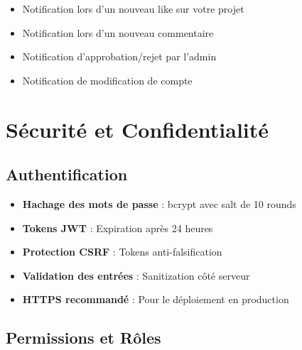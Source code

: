 \documentclass[12pt,a4paper]{article}
\begin{document}
\begin{itemize}[leftmargin=*]
    \item Notification lors d'un nouveau like sur votre projet
    \item Notification lors d'un nouveau commentaire
    \item Notification d'approbation/rejet par l'admin
    \item Notification de modification de compte
\end{itemize}

\newpage
\section{Sécurité et Confidentialité}

\subsection{Authentification}

\begin{tcolorbox}[colback=blue!5, colframe=blue!60, title=\faLock\ Mesures de Sécurité]
\begin{itemize}[leftmargin=*]
    \item \textbf{Hachage des mots de passe} : bcrypt avec salt de 10 rounds
    \item \textbf{Tokens JWT} : Expiration après 24 heures
    \item \textbf{Protection CSRF} : Tokens anti-falsification
    \item \textbf{Validation des entrées} : Sanitization côté serveur
    \item \textbf{HTTPS recommandé} : Pour le déploiement en production
\end{itemize}
\end{tcolorbox}

\subsection{Permissions et Rôles}
\end{document}
